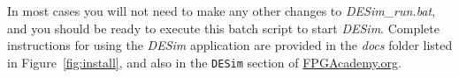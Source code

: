 \documentclass[11pt, twoside, pdftex]{article}
\newcommand{\commonPath}{../../../Tutorials/Common}
\begin{document}
In most cases you will not need to make any other changes to {\it DESim\_run.bat}, and you 
should be ready to execute this batch script to start {\it DESim}. Complete instructions for
using the {\it DESim} application are provided in the {\it docs} folder listed in 
Figure~\ref{fig:install}, and also in the 
\texttt{DESim} section of {\small \href{https://www.fpgacademy.org/tools.html}
{FPGAcademy.org}}.



\end{document}
